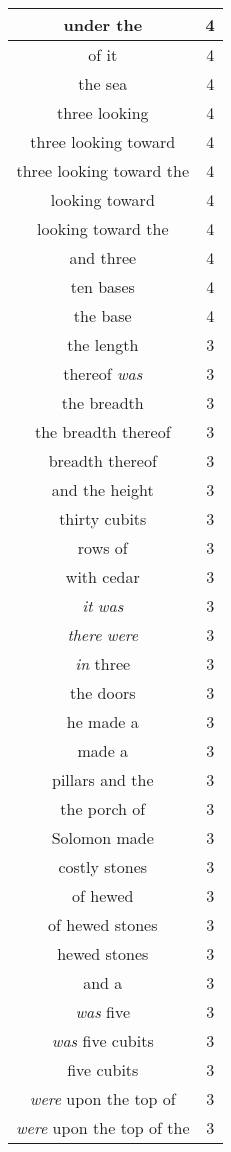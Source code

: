 \begin{center}
\begin{longtable}{|c|c|}
under the & 4\\ \hline 
of it & 4\\ \hline 
the sea & 4\\ \hline 
three looking & 4\\ \hline 
three looking toward & 4\\ \hline 
three looking toward the & 4\\ \hline 
looking toward & 4\\ \hline 
looking toward the & 4\\ \hline 
and three & 4\\ \hline 
ten bases & 4\\ \hline 
the base & 4\\ \hline 
the length & 3\\ \hline 
thereof \emph{was} & 3\\ \hline 
the breadth & 3\\ \hline 
the breadth thereof & 3\\ \hline 
breadth thereof & 3\\ \hline 
and the height & 3\\ \hline 
thirty cubits & 3\\ \hline 
rows of & 3\\ \hline 
with cedar & 3\\ \hline 
\emph{it} \emph{was} & 3\\ \hline 
\emph{there} \emph{were} & 3\\ \hline 
\emph{in} three & 3\\ \hline 
the doors & 3\\ \hline 
he made a & 3\\ \hline 
made a & 3\\ \hline 
pillars and the & 3\\ \hline 
the porch of & 3\\ \hline 
Solomon made & 3\\ \hline 
costly stones & 3\\ \hline 
of hewed & 3\\ \hline 
of hewed stones & 3\\ \hline 
hewed stones & 3\\ \hline 
and a & 3\\ \hline 
\emph{was} five & 3\\ \hline 
\emph{was} five cubits & 3\\ \hline 
five cubits & 3\\ \hline 
\emph{were} upon the top of & 3\\ \hline 
\emph{were} upon the top of the & 3\\ \hline 

\end{longtable}
\end{center}
